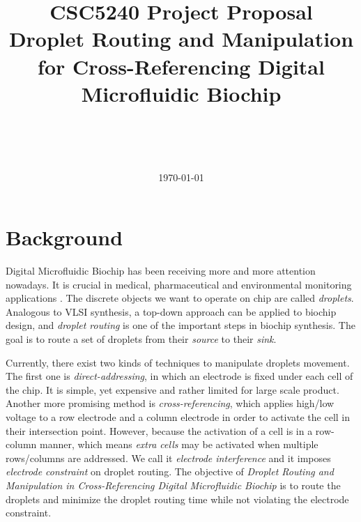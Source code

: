 \documentclass[a4paper,12pt]{article}
\title{CSC5240 Project Proposal\\\Large Droplet Routing and Manipulation for Cross-Referencing Digital Microfluidic Biochip}
\author{\myname\\\mymail\\\CSE\\\CUHK}
\date{\today}
\begin{document}

\maketitle
{}
\section{Background}
Digital Microfluidic Biochip has been receiving more and more attention nowadays.
It is crucial in medical, pharmaceutical and environmental monitoring applications \cite{verpoorte2003mmm}.
The discrete objects we want to operate on chip are called \textit{droplets}.
Analogous to VLSI synthesis, a top-down approach can be applied to biochip design,
and \textit{droplet routing} is one of the important steps in biochip synthesis.
The goal is to route a set of droplets from their \textit{source} to their \textit{sink}.

Currently, there exist two kinds of techniques to manipulate droplets movement.
The first one is \textit{direct-addressing},
in which an electrode is fixed under each cell of the chip.
It is simple, yet expensive and rather limited for large scale product.
Another more promising method is \textit{cross-referencing},
which applies high/low voltage to a row electrode and a column electrode
in order to activate the cell in their intersection point.
However, because the activation of a cell is in a row-column manner,
which means \textit{extra cells} may be activated when multiple rows/columns are addressed.
We call it \textit{electrode interference} and it imposes \textit{electrode constraint} on droplet routing.
The objective of \textit{Droplet Routing and Manipulation in Cross-Referencing Digital Microfluidic Biochip}
is to route the droplets and minimize the droplet routing time while not violating the electrode constraint.
\end{document}
